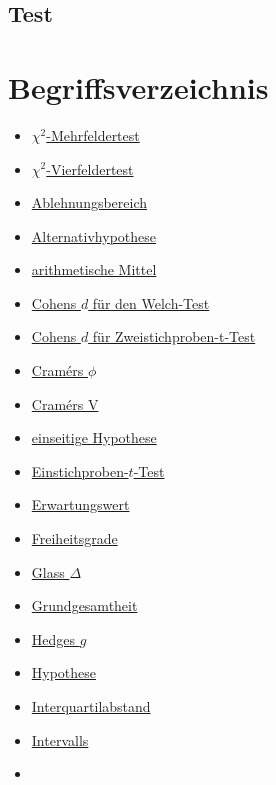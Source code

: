\documentclass[
]{book}
\providecommand{\tightlist}{%
  \setlength{\itemsep}{0pt}\setlength{\parskip}{0pt}}
\theoremstyle{definition}
\theoremstyle{definition}
\theoremstyle{definition}
\theoremstyle{definition}
\theoremstyle{remark}
\begin{document}
\section{Test}\label{test-7}

\chapter*{Begriffsverzeichnis}\label{begriffsverzeichnis}

\begin{itemize}
\tightlist
\item
  \hyperref[customdef-mehrfeldertest]{\(\chi^2\)-Mehrfeldertest}
\item
  \hyperref[customdef-vierfeldertest]{\(\chi^2\)-Vierfeldertest}
\item
  \hyperref[customdef-ablehnungsbereich]{Ablehnungsbereich}
\item
  \hyperref[customdef-alternativhypothese]{Alternativhypothese}
\item
  \hyperref[customdef-arithmetisches-mittel]{arithmetische Mittel}
\item
  \hyperref[customdef-welch-cohens-d]{Cohens \(d\) für den Welch-Test}
\item
  \hyperref[customdef-cohens-d]{Cohens \(d\) für Zweistichproben-t-Test}
\item
  \hyperref[customdef-cramers-phi]{Cramérs \(\phi\)}
\item
  \hyperref[customdef-cramers-v]{Cramérs V}
\item
  \hyperref[customdef-einseitige-hypothese]{einseitige Hypothese}
\item
  \hyperref[customdef-t-test]{Einstichproben-\(t\)-Test}
\item
  \hyperref[customdef-erwartungswert]{Erwartungswert}
\item
  \hyperref[customdef-freiheitsgrade]{Freiheitsgrade}
\item
  \hyperref[customdef-glass-delta]{Glass \(\Delta\)}
\item
  \hyperref[customdef-grundgesamtheit]{Grundgesamtheit}
\item
  \hyperref[customdef-hedges-g]{Hedges \(g\)}
\item
  \hyperref[customdef-hypothese]{Hypothese}
\item
  \hyperref[customdef-iqr]{Interquartilabstand}
\item
  \hyperref[customdef-interval]{Intervalls}
\item

\end{itemize}
\end{document}
